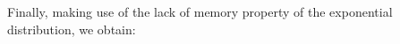 \documentclass[11pt]{article}
\begin{document}
Finally, making use of the lack of memory property of the exponential distribution, we obtain:
\small
\end{document}
